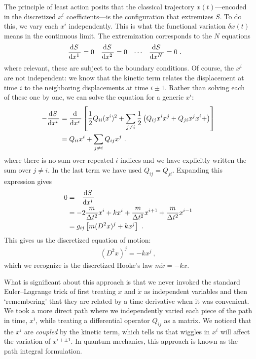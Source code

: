 The principle of least action posits that the classical trajectory $x(t)$---encoded in the discretized $x^i$ coefficients---is the configuration that extremizes $S$. To do this, we vary each $x^i$ independently. This is what the functional variation $\delta x(t)$ means in the continuous limit. The extremization corresponds to the $N$ equations
\begin{align}
    \frac{\operatorname{d}\mkern-3mu^{}\mkern-1mu{S}\,}{\operatorname{d}\mkern-3mu^{}\mkern-1mu{x^1}\,} &= 0
    &
    \frac{\operatorname{d}\mkern-3mu^{}\mkern-1mu{S}\,}{\operatorname{d}\mkern-3mu^{}\mkern-1mu{x^2}\,} &= 0
    &
    \cdots&
    &
    \frac{\operatorname{d}\mkern-3mu^{}\mkern-1mu{S}\,}{\operatorname{d}\mkern-3mu^{}\mkern-1mu{x^N}\,} &= 0 \ .
\end{align}
where relevant, these are subject to the boundary conditions. 
% 
Of course, the $x^i$ are not independent: we know that the kinetic term relates the displacement at time $i$ to the neighboring displacements at time $i\pm 1$.
% 
Rather than solving each of these one by one, we can solve the equation for a generic $x^i$:
\begin{align}
    -\frac{\operatorname{d}\mkern-3mu^{}\mkern-1mu{S}\,}{\operatorname{d}\mkern-3mu^{}\mkern-1mu{x^i}\,} &= 
    \frac{\operatorname{d}\mkern-3mu^{}\mkern-1mu{}\,}{\operatorname{d}\mkern-3mu^{}\mkern-1mu{x^i}\,}
    \left[
    \frac{1}{2} Q_{ii}(x^i)^2 + \sum_{j\neq i} \frac{1}{2}\left(Q_{ij} x^ix^j + Q_{ji}x^jx^i + \right) 
    \right] \\
    &= 
    Q_{ii}x^i+ \sum_{j\neq i} Q_{ij}x^j \ .
\end{align}
where there is no sum over repeated $i$ indices and we have explicitly written the sum over $j\neq i$. In the last term we have used $Q_{ij} = Q_{ji}$. Expanding this expression gives
\begin{align}
    0&=
    -\frac{\operatorname{d}\mkern-3mu^{}\mkern-1mu{S}\,}{\operatorname{d}\mkern-3mu^{}\mkern-1mu{x^i}\,}
    \\
    &=
    -2\frac{m}{\Delta t^2} x^i + k x^i 
    + \frac{m}{\Delta t^2}x^{i+1} 
    + \frac{m}{\Delta t^2}x^{i-1}
    \\
    &= 
    g_{ij}\left[m(D^2x)^j + k x^j\right] \ .
\end{align}
This gives us the discretized equation of motion:
\begin{align}
    (D^2x)^j = - k x^j \ ,
\end{align}
which we recognize is the discretized Hooke's law $m\ddot{x} = -k x$. 

What is significant about this approach is that we never invoked the standard Euler--Lagrange trick of first treating $x$ and $\dot{x}$ as independent variables and then `remembering' that they are related by a time derivative when it was convenient. We took a more direct path where we independently varied each piece of the path in time, $x^i$, while treating a differential operator $Q_{ij}$ as a matrix. We noticed that the $x^i$ are \emph{coupled} by the kinetic term, which tells us that wiggles in $x^i$ will affect the variation of $x^{i+\pm 1}$. In quantum mechanics, this approach is known as the path integral formulation.

